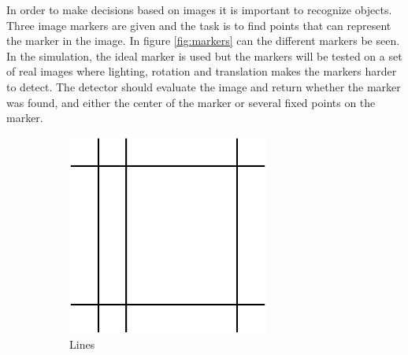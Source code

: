 In order to make decisions based on images it is important to recognize objects.
Three image markers are given and the task is to find points that can represent the marker in the image.
In figure \ref{fig:markers} can the different markers be seen.
In the simulation, the ideal marker is used but the markers will be tested on a set of real images where lighting, rotation and translation makes the markers harder to detect.
The detector should evaluate the image and return whether the marker was found, and either the center of the marker or several fixed points on the marker.

\begin{figure}[h]
\centering
 \begin{subfigure}[b]{0.3\linewidth}
 \centering
 \includegraphics[width=\linewidth]{graphics/Marker2a}
 \caption{Lines}
 \label{marker:cross}
 \end{subfigure}~
 \begin{subfigure}[b]{0.3\linewidth}
 \centering

\end{subfigure}
\end{figure}
